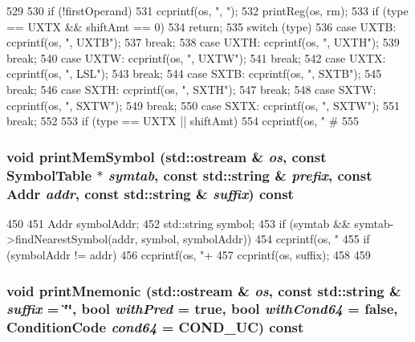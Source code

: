\begin{DoxyCode}
529 {
530     if (!firstOperand)
531         ccprintf(os, ", ");
532     printReg(os, rm);
533     if (type == UXTX && shiftAmt == 0)
534         return;
535     switch (type) {
536       case UXTB: ccprintf(os, ", UXTB");
537         break;
538       case UXTH: ccprintf(os, ", UXTH");
539         break;
540       case UXTW: ccprintf(os, ", UXTW");
541         break;
542       case UXTX: ccprintf(os, ", LSL");
543         break;
544       case SXTB: ccprintf(os, ", SXTB");
545         break;
546       case SXTH: ccprintf(os, ", SXTH");
547         break;
548       case SXTW: ccprintf(os, ", SXTW");
549         break;
550       case SXTX: ccprintf(os, ", SXTW");
551         break;
552     }
553     if (type == UXTX || shiftAmt)
554         ccprintf(os, " #%
555 }
\end{DoxyCode}
\hypertarget{classArmISA_1_1ArmStaticInst_a2e070f27c98b230d26db666f40256594}{
\subsubsection[{printMemSymbol}]{\setlength{\rightskip}{0pt plus 5cm}void printMemSymbol (std::ostream \& {\em os}, \/  const SymbolTable $\ast$ {\em symtab}, \/  const std::string \& {\em prefix}, \/  const {\bf Addr} {\em addr}, \/  const std::string \& {\em suffix}) const}}
\label{classArmISA_1_1ArmStaticInst_a2e070f27c98b230d26db666f40256594}



\begin{DoxyCode}
450 {
451     Addr symbolAddr;
452     std::string symbol;
453     if (symtab && symtab->findNearestSymbol(addr, symbol, symbolAddr)) {
454         ccprintf(os, "%
455         if (symbolAddr != addr)
456             ccprintf(os, "+%
457         ccprintf(os, suffix);
458     }
459 }
\end{DoxyCode}
\hypertarget{classArmISA_1_1ArmStaticInst_a88eea7239477478ffadf11474ea8454f}{
\subsubsection[{printMnemonic}]{\setlength{\rightskip}{0pt plus 5cm}void printMnemonic (std::ostream \& {\em os}, \/  const std::string \& {\em suffix} = {\ttfamily \char`\"{}\char`\"{}}, \/  bool {\em withPred} = {\ttfamily true}, \/  bool {\em withCond64} = {\ttfamily false}, \/  {\bf ConditionCode} {\em cond64} = {\ttfamily COND\_\-UC}) const}}
\label{classArmISA_1_1ArmStaticInst_a88eea7239477478ffadf11474ea8454f}



